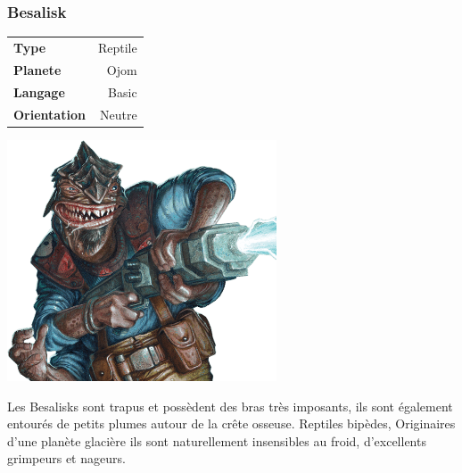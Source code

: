 \subsubsection{Besalisk}
\vspace{-2\baselineskip}
\begin{flushright}	
    \begin{tabular}{|l|r|}
        \textbf{Type} & Reptile \\
        \textbf{Planete} & Ojom \\
        \textbf{Langage} & Basic \\
        \textbf{Orientation} & Neutre\\
    \end{tabular}
\end{flushright}
\vspace{-3\baselineskip}
\includegraphics[width=8cm]{img/personnages/races/besalisk.png}
 
Les Besalisks sont trapus et possèdent des bras très imposants, ils sont également entourés de petits plumes autour de la crête osseuse. Reptiles bipèdes, Originaires d’une planète glacière ils sont naturellement insensibles au froid, d’excellents grimpeurs et nageurs.

